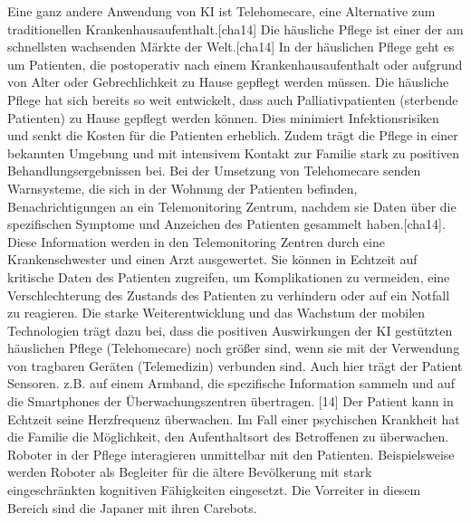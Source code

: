 Eine ganz andere  Anwendung von KI ist Telehomecare, eine Alternative zum traditionellen Krankenhausaufenthalt.[cha14] Die häusliche Pflege ist einer der am schnellsten wachsenden Märkte der Welt.[cha14] In der häuslichen Pflege geht es um Patienten, die postoperativ nach einem Krankenhausaufenthalt oder aufgrund von Alter oder Gebrechlichkeit zu Hause gepflegt werden müssen. Die häusliche Pflege hat sich bereits so weit entwickelt, dass auch Palliativpatienten (sterbende Patienten) zu Hause gepflegt werden können. Dies minimiert Infektionsrisiken und senkt die Kosten für die Patienten erheblich. Zudem trägt die Pflege in einer bekannten Umgebung und mit intensivem Kontakt zur Familie stark zu positiven Behandlungsergebnissen bei.
Bei der Umsetzung von Telehomecare senden Warnsysteme, die sich in der Wohnung der Patienten befinden, Benachrichtigungen an ein Telemonitoring Zentrum, nachdem sie Daten über die spezifischen Symptome und Anzeichen des Patienten gesammelt haben.[cha14]. Diese Information werden in den Telemonitoring Zentren durch eine Krankenschwester und einen Arzt ausgewertet. Sie können in Echtzeit auf kritische Daten des Patienten zugreifen, um Komplikationen zu vermeiden, eine Verschlechterung des Zustands des Patienten zu verhindern oder auf ein Notfall zu reagieren.
Die starke Weiterentwicklung und das Wachstum der mobilen Technologien trägt dazu bei, dass die positiven Auswirkungen der KI gestützten häuslichen Pflege (Telehomecare) noch größer sind, wenn sie mit der Verwendung von tragbaren Geräten (Telemedizin) verbunden sind. Auch hier trägt der Patient Sensoren. z.B. auf einem Armband, die spezifische Information sammeln und auf die Smartphones der Überwachungszentren übertragen. [14] Der Patient kann in Echtzeit seine Herzfrequenz überwachen. Im Fall einer psychischen Krankheit hat die Familie die Möglichkeit, den Aufenthaltsort des Betroffenen zu überwachen.\\ 

Roboter in der Pflege interagieren unmittelbar mit den Patienten. Beispielsweise werden Roboter als Begleiter für die ältere Bevölkerung mit stark eingeschränkten kognitiven Fähigkeiten eingesetzt. Die Vorreiter in diesem Bereich sind die Japaner mit ihren Carebots.